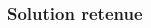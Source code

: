 \begin{frame}
\begin{columns}
\begin{column}{7cm}
\begin{figure}
{}
\end{figure}
\end{column}
\end{columns}
\end{frame}

\subsubsection[Solution retenue]{Solution retenue}

